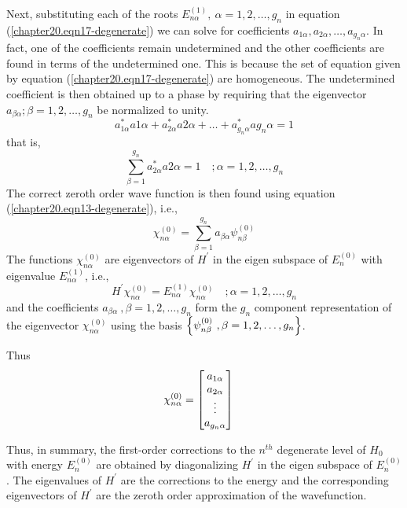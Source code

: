 		Next, substituting each of the roots $E_{n\alpha}^{(1)}, \ \alpha=1,2,\ldots,g_n$ in equation (\ref{chapter20.eqn17-degenerate}) we can solve for coefficients $a_{1\alpha}, a_{2 \alpha}, \ldots, a_{g_n \alpha}$. In fact, one of the coefficients remain undetermined and the other coefficients are found in terms of the undetermined one. This is because the set of equation given by equation (\ref{chapter20.eqn17-degenerate}) are homogeneous. The undetermined coefficient is then obtained up to a phase by requiring that the eigenvector $a_{\beta\alpha}; \beta = 1,2,\ldots, g_n$ be normalized to unity.
		\begin{equation}
			a^{*}_{1\alpha} a{1\alpha}  +  a^{*}_{2\alpha} a{2\alpha} + \ldots + a^{*}_{g_n\alpha} a{g_n\alpha} = 1
		\end{equation}
		that is,
		\begin{equation}
			\sum_{\beta = 1}^{g_n}	a^{*}_{2\alpha} a{2\alpha} = 1 \quad ; \alpha=1,2,\ldots, g_n
		\end{equation}
		The correct zeroth order wave function is then found using equation (\ref{chapter20.eqn13-degenerate}), i.e.,
		\begin{equation}
			\chi_{n\alpha}^{(0)} = \sum_{\beta = 1}^{g_n} a_{\beta\alpha} \psi_{n\beta}^{(0)}
		\end{equation}
		The functions $\chi_{n\alpha}^{(0)}$ are eigenvectors of $H^\prime$ in the eigen subspace of $E_n^{(0)}$ with eigenvalue $E_{n\alpha}^{(1)}$, i.e.,
		\begin{equation}
			H^\prime \chi_{n\alpha}^{(0)}= E_{n\alpha}^{(1)} \chi_{n\alpha}^{(0)} \quad ; \alpha = 1,2,\ldots, g_n
		\end{equation}
		and the coefficients $a_{\beta \alpha}\ , \beta=1,2, \ldots, g_n$ form the $g_n$ component representation of the eigenvector $\chi_{n\alpha}^{(0)}$ using the basis $\qty{\psi_{n\beta}^{(0)}\ , \beta =1,2, \ldots,g_n}$.
		
		Thus
		\begin{align}
			\chi_{n\alpha}^{(0)} &= \mqty[a_{1\alpha} \\ a_{2\alpha} \\ \vdots \\ a_{g_n\alpha}] 
		\end{align}
		
		Thus, in summary, the first-order corrections to the $n^{th}$ degenerate level of $H_0$ with energy $E_n^{(0)}$ are obtained by diagonalizing $H^\prime$ in the eigen subspace of $E_n^{(0)}$. The eigenvalues of $H^\prime$ are the corrections to the energy and the corresponding eigenvectors of $H^\prime$ are the zeroth order approximation of the wavefunction.
		
